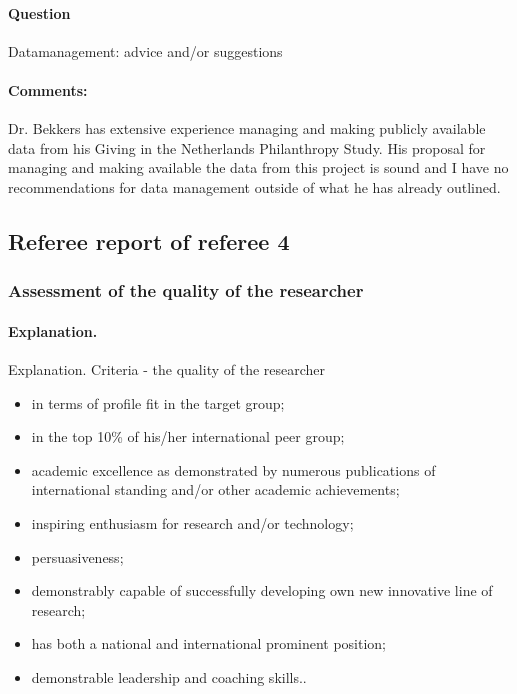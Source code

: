 \documentclass[twocolumn, serif, rga, numeric]{jote-article}
\begin{document}
\paragraph{Question}
Datamanagement: advice and/or suggestions
\paragraph{Comments:}
Dr. Bekkers has extensive experience managing and making publicly available data from his Giving in the Netherlands Philanthropy Study. His proposal for managing and making available the data from this project is sound and I have no recommendations for data management outside of what he has already outlined.

 {}\subsection*{Referee report of referee 4} 
 {}\subsubsection*{Assessment of the quality of the researcher} 
\paragraph{Explanation.} Explanation. Criteria - the quality of the researcher

\begin{itemize}
   \item in terms of profile fit in the target group;
 \item in the top 10\% of his/her international peer group;
 \item academic excellence as demonstrated by numerous publications of international standing and/or other academic achievements;
 \item inspiring enthusiasm for research and/or technology;
 \item persuasiveness;
 \item demonstrably capable of successfully developing own new innovative line of research;
 \item has both a national and international prominent position;
 \item demonstrable leadership and coaching skills..
    \end{itemize}
\end{document}
